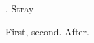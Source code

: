 
\document
{}. Stray\endhead
\roster
\item First, \runinitem second.
\endroster
After.
\enddocument
